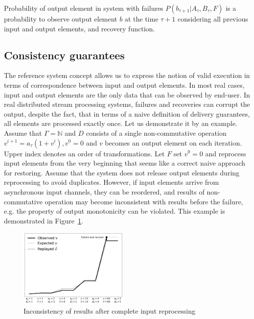\begin{definition}{Probability of output element in system with failures}
$P(b_{\tau+1}|A_{\tau}, B_\tau, F)$ is a probability to observe output element $b$ at the time $\tau+1$ considering all previous input and output elements, and recovery function.
\end{definition}

\subsection{Consistency guarantees}

The reference system concept allows us to express the notion of valid execution in terms of correspondence between input and output elements. In most real cases, input and output elements are the only data that can be observed by end-user. In real distributed stream processing systems, failures and recoveries can corrupt the output, despite the fact, that in terms of a naive definition of delivery guarantees, all elements are processed exactly once. Let us demonstrate it by an example. Assume that $\Gamma=\mathbb{N}$ and $D$ consists of a single non-commutative operation $v^{i+1}=a_\tau(1+v^{i}),v^{0}=0$ and $v$ becomes an output element on each iteration. Upper index denotes an order of transformations. Let $F$ set $v^{0}=0$ and reprocess input elements from the very beginning that seems like a correct naive approach for restoring. Assume that the system does not release output elements during reprocessing to avoid duplicates. However, if input elements arrive from asynchronous input channels, they can be reordered, and results of non-commutative operation may become inconsistent with results before the failure, e.g. the property of output monotonicity can be violated. This example is demonstrated in Figure~\ref{state-inconsistency}. 

\begin{figure}[htbp]
  \centering
  \includegraphics[width=0.48\textwidth]{pics/failure}
  \caption{Inconsistency of results after complete input reprocessing}
  \label {state-inconsistency}
\end{figure}

